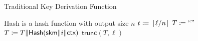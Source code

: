 \begin{algorithm}[t]
\caption{Traditional Key Derivation Function}
\label{alg:trad_kdf}
\begin{algorithmic}[1]
\Require \textsf{Hash} is a hash function with output size $n$
    \State $t \coloneqq{} \left\lceil \ell/n \right\rceil$
    \State $T \coloneqq{} \text{``''}$
        \State $T \coloneqq{} T\|\textsf{Hash}(\textsf{skm}\|i\|\textsf{ctx})$
    \EndFor
    \State \Return $\textsf{trunc}(T, \ell)$
\EndProcedure
\end{algorithmic}
\end{algorithm}
